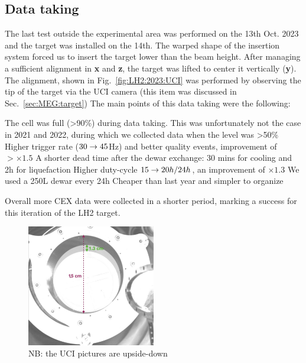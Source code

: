 \begin{refsection}
    \subsection{Data taking}
        The last test outside the experimental area was performed on the 13th Oct. 2023 and the target was installed on the 14th.
        The warped shape of the insertion system forced us to insert the target lower than the beam height. 
        After managing a sufficient alignment in \textbf{x} and \textbf{z}, the target was lifted to center it vertically (\textbf{y}). The alignment, shown in Fig.~\ref{fig:LH2:2023:UCI} was performed by observing the tip of the target via the UCI camera (this item was discussed in Sec.~\ref{sec:MEG:target})
        The main points of this data taking were the following:
        \begin{outline}
            \1 The cell was full (>90\%) during data taking. This was unfortunately not the case in 2021 and 2022, during which we collected data when the level was >50\%
            \2[->] Higher trigger rate ($30\rightarrow45$Hz) and better quality events, improvement of $>\times1.5$
            \1 A shorter dead time after the dewar exchange: 30 mins for cooling and 2h for liquefaction
            \2[->] Higher duty-cycle $15\rightarrow20h/24h$, an improvement of $\times1.3$
            \1 We used a 250L dewar every 24h
            \2[->] Cheaper than last year and simpler to organize
        \end{outline}
        Overall more CEX data were collected in a shorter period, marking a success for this iteration of the LH2 target. 

        \begin{figure}
            \centering
            \includegraphics[width=0.5\textwidth]{Figures/LH2/2023/LH2_UCI_2023.png}
            \caption[Short Caption]{NB: the UCI pictures are upside-down}
            \label{fig:CEX:2023:tests}
        \end{figure}


\end{refsection}
